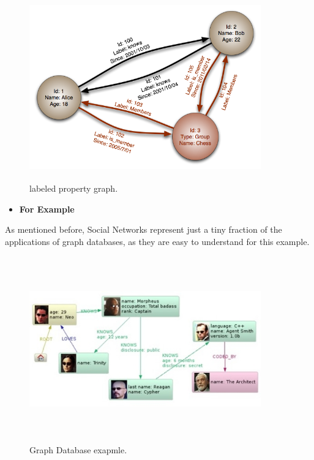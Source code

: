 \begin{figure}[h]
\centering
  \includegraphics[width=10cm,height=8cm]{L2.png}
  \caption{labeled property graph.}\label{labeled property graph.}
\end{figure}

\begin{itemize}
  \item \textbf{For Example}
\end{itemize}
\hspace*{0.7in} As mentioned before, Social Networks represent just a tiny fraction of the applications of graph databases, as they are easy to understand for this example.
\\
\begin{figure}[h]
\centering
  \includegraphics[width=10cm,height=8cm]{L3.jpg}
  \caption{Graph Database exapmle.}\label{Graph Database exapmle.}
\end{figure}
\\

